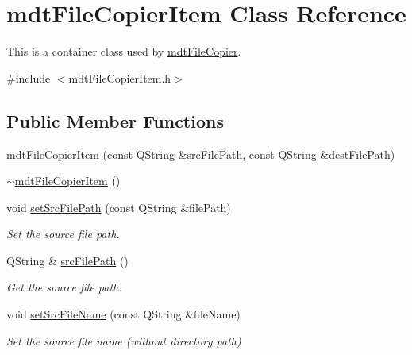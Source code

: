 \hypertarget{classmdt_file_copier_item}{\section{mdt\-File\-Copier\-Item Class Reference}
\label{classmdt_file_copier_item}
}


This is a container class used by \hyperlink{classmdt_file_copier}{mdt\-File\-Copier}.  




{\ttfamily \#include $<$mdt\-File\-Copier\-Item.\-h$>$}

\subsection*{Public Member Functions}
\begin{DoxyCompactItemize}
\item 
\hyperlink{classmdt_file_copier_item_a5c693ba1085b9aba9dbad740aa896c5e}{mdt\-File\-Copier\-Item} (const Q\-String \&\hyperlink{classmdt_file_copier_item_ace10385b5d1b591935ace03139c5a3db}{src\-File\-Path}, const Q\-String \&\hyperlink{classmdt_file_copier_item_ab5993351e732b94e723621f5227fdd90}{dest\-File\-Path})
\item 
\hyperlink{classmdt_file_copier_item_aef37f5ca03cb4215e867f5e294a41461}{$\sim$mdt\-File\-Copier\-Item} ()
\item 
void \hyperlink{classmdt_file_copier_item_ac0f38067d504644f35040054951f0ae0}{set\-Src\-File\-Path} (const Q\-String \&file\-Path)
\begin{DoxyCompactList}\small\item\em Set the source file path. \end{DoxyCompactList}\item 
Q\-String \& \hyperlink{classmdt_file_copier_item_ace10385b5d1b591935ace03139c5a3db}{src\-File\-Path} ()
\begin{DoxyCompactList}\small\item\em Get the source file path. \end{DoxyCompactList}\item 
void \hyperlink{classmdt_file_copier_item_aaa40ea880f28da1f8eb08f86fdc778b6}{set\-Src\-File\-Name} (const Q\-String \&file\-Name)
\begin{DoxyCompactList}\small\item\em Set the source file name (without directory path) \end{DoxyCompactList}\item 

\end{DoxyCompactItemize}
